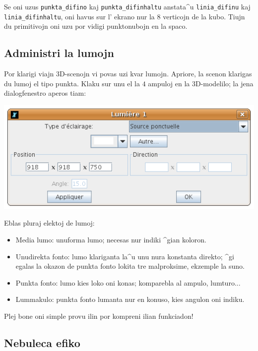 Se oni uzus \texttt{punkta\_difino} kaj \texttt{punkta\_difinhaltu}
anstata^u \texttt{linia\_difinu} kaj \texttt{linia\_difinhaltu}, oni
havus sur l' ekrano nur la $8$ verticojn de la kubo.  Tiujn du
primitivojn oni uzu por vidigi punktonubojn en la spaco.

\subsection{Administri la lumojn}

Por klarigi viajn 3D-scenojn vi povas uzi kvar lumojn.  Apriore, la
scenon klarigas du lumoj el tipo punkta.  Klaku sur unu el la $4$
ampuloj en la 3D-modelilo; la jena dialogfenestro aperos tiam:
\begin{center}
 \includegraphics*[scale=0.6]{bildoj/CaptureLight.png}
\end{center}
Eblas pluraj elektoj de lumoj:
\begin{itemize}
\item Media lumo: unuforma lumo; necesas nur indiki ^gian koloron.
\item Unudirekta fonto: lumo klariganta la^u unu nura konstanta
  direkto; ^gi egalas la okazon de punkta fonto lokita tre
  malproksime, ekzemple la suno.
\item Punkta fonto: lumo kies loko oni konas; komparebla al ampulo, lumturo...
\item Lummakulo: punkta fonto lumanta nur en konuso, kies angulon oni indiku.
\end{itemize}

Plej bone oni simple provu ilin por kompreni ilian funkciadon!

\subsection*{Nebuleca efiko}


